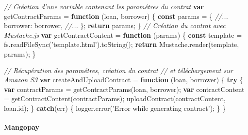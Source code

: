 \documentclass[12pt,a4paper]{article}
\newenvironment{Shaded}{}{}
\newcommand{\KeywordTok}[1]{\textcolor[rgb]{0.00,0.44,0.13}{\textbf{{#1}}}}
\newcommand{\DataTypeTok}[1]{\textcolor[rgb]{0.56,0.13,0.00}{{#1}}}
\newcommand{\StringTok}[1]{\textcolor[rgb]{0.25,0.44,0.63}{{#1}}}
\newcommand{\CommentTok}[1]{\textcolor[rgb]{0.38,0.63,0.69}{\textit{{#1}}}}
\newcommand{\VariableTok}[1]{\textcolor[rgb]{0.10,0.09,0.49}{{#1}}}
\newcommand{\ControlFlowTok}[1]{\textcolor[rgb]{0.00,0.44,0.13}{\textbf{{#1}}}}
\newcommand{\OperatorTok}[1]{\textcolor[rgb]{0.40,0.40,0.40}{{#1}}}
\newcommand{\AttributeTok}[1]{\textcolor[rgb]{0.49,0.56,0.16}{{#1}}}
\newcommand{\NormalTok}[1]{{#1}}
\begin{document}
  \begin{Shaded}
  \begin{Highlighting}[]
  \CommentTok{// Création d'une variable contenant les paramétres du contrat}
  \KeywordTok{var} \NormalTok{getContractParams }\OperatorTok{=} \KeywordTok{function} \NormalTok{(loan}\OperatorTok{,} \NormalTok{borrower) }\OperatorTok{\{}
    \KeywordTok{const} \NormalTok{params }\OperatorTok{=} \OperatorTok{\{}
      \CommentTok{//...}
      \DataTypeTok{borrower}\OperatorTok{:} \NormalTok{borrower}\OperatorTok{,}
      \CommentTok{//...}
    \OperatorTok{\};}
    \ControlFlowTok{return} \NormalTok{params}\OperatorTok{;}
  \OperatorTok{\}}
  \CommentTok{// Création du contrat avec Mustache.js}
  \KeywordTok{var} \NormalTok{getContractContent }\OperatorTok{=} \KeywordTok{function} \NormalTok{(params) }\OperatorTok{\{}
    \KeywordTok{const} \NormalTok{template }\OperatorTok{=} \VariableTok{fs}\NormalTok{.}\AttributeTok{readFileSync}\NormalTok{(}\StringTok{'template.html'}\NormalTok{).}\AttributeTok{toString}\NormalTok{()}\OperatorTok{;}
    \ControlFlowTok{return} \VariableTok{Mustache}\NormalTok{.}\AttributeTok{render}\NormalTok{(template}\OperatorTok{,} \NormalTok{params)}\OperatorTok{;}
  \OperatorTok{\}}

  \CommentTok{// Récupération des paramétres, création du contrat}
  \CommentTok{// et téléchargement sur Amazon S3}
  \KeywordTok{var} \NormalTok{createAndUploadContract }\OperatorTok{=} \KeywordTok{function} \NormalTok{(loan}\OperatorTok{,} \NormalTok{borrower) }\OperatorTok{\{}
    \ControlFlowTok{try} \OperatorTok{\{}
      \KeywordTok{var} \NormalTok{contractParams }\OperatorTok{=} \AttributeTok{getContractParams}\NormalTok{(loan}\OperatorTok{,} \NormalTok{borrower)}\OperatorTok{;}
      \KeywordTok{var} \NormalTok{contractContent }\OperatorTok{=} \AttributeTok{getContractContent}\NormalTok{(contractParams)}\OperatorTok{;}
      \AttributeTok{uploadContract}\NormalTok{(contractContent}\OperatorTok{,} \VariableTok{loan}\NormalTok{.}\AttributeTok{id}\NormalTok{)}\OperatorTok{;}
    \OperatorTok{\}} \ControlFlowTok{catch}\NormalTok{(err) }\OperatorTok{\{}
      \VariableTok{logger}\NormalTok{.}\AttributeTok{error}\NormalTok{(}\StringTok{'Error while generating contract'}\NormalTok{)}\OperatorTok{;}
    \OperatorTok{\}}
  \OperatorTok{\}}
  \end{Highlighting}
  \end{Shaded}

  \bigskip

  \paragraph{Mangopay}\label{mangopay}
\end{document}
